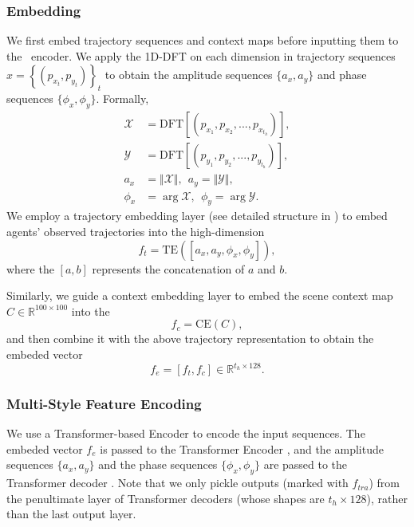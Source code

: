 \documentclass[../paper.tex]{subfiles}
\begin{document}
\subsubsection{Embedding}

We first embed trajectory sequences and context maps before inputting them to the \ALPHAMODEL~encoder.
We apply the 1D-DFT on each dimension in trajectory sequences $x = \left\{(p_{x_t}, p_{y_t})\right\}_t$ to obtain the amplitude sequences $\{a_x, a_y\}$ and phase sequences $\{\phi_x, \phi_y\}$.
Formally,
\begin{equation}
    \begin{aligned}
        \mathcal{X} &= \mbox{DFT}[(p_{x_1}, p_{x_2}, ..., p_{x_{t_h}})], \\
        \mathcal{Y} &= \mbox{DFT}[(p_{y_1}, p_{y_2}, ..., p_{y_{t_h}})], \\
        a_x &= \Vert \mathcal{X} \Vert,~~a_y = \Vert \mathcal{Y} \Vert, \\
        \phi_x &= \arg \mathcal{X},~~\phi_y = \arg \mathcal{Y}.
    \end{aligned}
\end{equation}
We employ a trajectory embedding layer (see detailed structure in ) to embed agents' observed trajectories into the high-dimension
\begin{equation}
    f_t = \mbox{TE}([a_x, a_y, \phi_x, \phi_y]),
\end{equation}
where the $[a, b]$ represents the concatenation of $a$ and $b$.

Similarly, we guide a context embedding layer to embed the scene context map $C \in \mathbb{R}^{100 \times 100}$ into the
\begin{equation}
    f_c = \mbox{CE}(C),
\end{equation}
and then combine it with the above trajectory representation to obtain the embeded vector
\begin{equation}
    f_e = [f_t, f_c] \in \mathbb{R}^{t_h \times 128}.
\end{equation}

\subsubsection{Multi-Style Feature Encoding}

We use a Transformer-based Encoder to encode the input sequences.
The embeded vector $f_e$ is passed to the Transformer Encoder \cite{attentionIsAllYouNeed}, and the amplitude sequences $\{a_x, a_y\}$ and the phase sequences $\{\phi_x, \phi_y\}$ are passed to the Transformer decoder \cite{attentionIsAllYouNeed}.
Note that we only pickle outputs (marked with $f_{tra}$) from the penultimate layer of Transformer decoders (whose shapes are $t_h \times 128$), rather than the last output layer.
\end{document}
